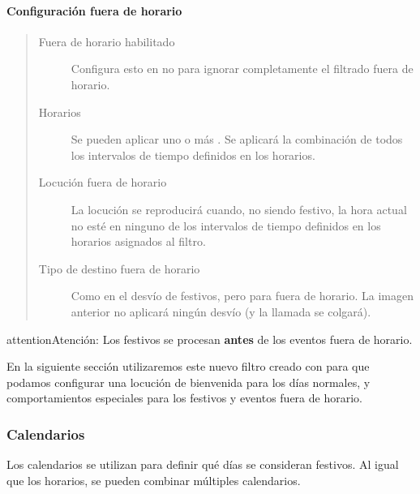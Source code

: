 \documentclass[letterpaper,10pt,spanish]{sphinxmanual}
\begin{document}
\paragraph{Configuración fuera de horario}
\label{administration_portal/client/vpbx/routing_tools/external_call_filters:out-of-schedule-configuration}\begin{quote}
\begin{description}
\item[{Fuera de horario habilitado}] \leavevmode
Configura esto en no para ignorar completamente el filtrado fuera de horario.

\item[{Horarios}] \leavevmode
Se pueden aplicar uno o más {\hyperref[administration_portal/client/vpbx/routing_tools/schedules:schedules]{}}. Se aplicará la combinación de todos los intervalos de tiempo definidos en los horarios.

\item[{Locución fuera de horario}] \leavevmode
La locución se reproducirá cuando, no siendo festivo, la hora actual no esté en ninguno de los intervalos de tiempo definidos en los horarios asignados al filtro.

\item[{Tipo de destino fuera de horario}] \leavevmode
Como en el desvío de festivos, pero para fuera de horario. La imagen anterior no aplicará ningún desvío (y la llamada se colgará).

\end{description}
\end{quote}

\begin{notice}{attention}{Atención:}
Los festivos se procesan \textbf{antes} de los eventos fuera de horario.
\end{notice}

En la siguiente sección utilizaremos este nuevo filtro creado con {\hyperref[administration_portal/brand/views/ddis:ddis]{}} para que podamos configurar una locución de bienvenida para los días normales, y comportamientos especiales para los festivos y eventos fuera de horario.


\subsubsection{Calendarios}
\label{administration_portal/client/vpbx/routing_tools/calendars:calendars}\label{administration_portal/client/vpbx/routing_tools/calendars::doc}\label{administration_portal/client/vpbx/routing_tools/calendars:id1}
Los calendarios se utilizan para definir qué días se consideran festivos. Al igual que los horarios, se pueden combinar múltiples calendarios.
\end{document}
